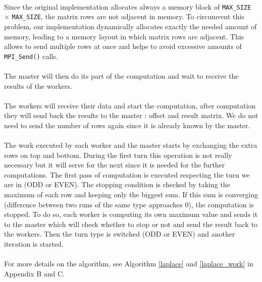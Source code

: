 \documentclass[]{article}
\begin{document}
\paragraph{} Since the original implementation allocates always a memory block of \texttt{MAX\_SIZE} $\times$ \texttt{MAX\_SIZE}, the matrix rows are not adjacent in memory. To circumvent this problem, our implementation dynamically allocates exactly the needed amount of memory, leading to a memory layout in which matrix rows are adjacent. This allows to send multiple rows at once and helps to avoid excessive amounts of \texttt{MPI\_Send()} calls.

\paragraph{} The master will then do its part of the computation and wait to receive the results of the workers. 

\paragraph{} The workers will receive their data and start the computation, after computation they will send back the results to the master : offset and result matrix. We do not need to send the number of rows again since it is already known by the master. 

\paragraph{} The work executed by each worker and the master starts by exchanging the extra rows on top and bottom. During the first turn this operation is not really necessary but it will serve for the next since it is needed for the further computations. The first pass of computation is executed respecting the turn we are in (ODD or EVEN). The stopping condition is checked by taking the maximum of each row and keeping only the biggest sum. If this sum is converging (difference between two runs of the same type approaches $0$), the computation is stopped. To do so, each worker is computing its own maximum value and sends it to the master which will check whether to stop or not and send the result back to the workers. Then the turn type is switched (ODD or EVEN) and another iteration is started.

\paragraph{} For more details on the algorithm, see Algorithm \ref{laplace} and \ref{laplace_work} in Appendix B and C.
\end{document}
